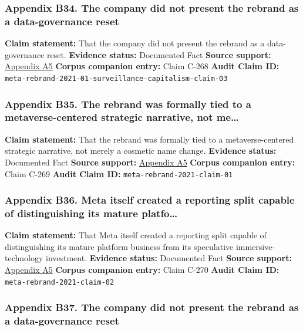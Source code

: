 \documentclass[
  american,
  11pt,
  letterpaper,
]{article}
\begin{document}
\subsubsection{Appendix B34. The company did not present the rebrand as
a data-governance
reset}\label{ch-01-appendix-b34-the-company-did-not-present-the-rebrand-as-a-data-governance-reset}

\textbf{Claim statement:} That the company did not present the rebrand
as a data-governance reset. \textbf{Evidence status:} Documented Fact
\textbf{Source support:}
\hyperref[ch-01-appendix-a5-the-facebook-company-is-now-meta]{Appendix
A5} \textbf{Corpus companion entry:} Claim C-268 \textbf{Audit Claim
ID:} \texttt{meta-rebrand-2021-01-surveillance-capitalism-claim-03}

\subsubsection{Appendix B35. The rebrand was formally tied to a
metaverse-centered strategic narrative, not
me\ldots{}}\label{ch-01-appendix-b35-the-rebrand-was-formally-tied-to-a-metaverse-centered-strategic-narrative-not-me}

\textbf{Claim statement:} That the rebrand was formally tied to a
metaverse-centered strategic narrative, not merely a cosmetic name
change. \textbf{Evidence status:} Documented Fact \textbf{Source
support:}
\hyperref[ch-01-appendix-a5-the-facebook-company-is-now-meta]{Appendix
A5} \textbf{Corpus companion entry:} Claim C-269 \textbf{Audit Claim
ID:} \texttt{meta-rebrand-2021-claim-01}

\subsubsection{Appendix B36. Meta itself created a reporting split
capable of distinguishing its mature
platfo\ldots{}}\label{ch-01-appendix-b36-meta-itself-created-a-reporting-split-capable-of-distinguishing-its-mature-platfo}

\textbf{Claim statement:} That Meta itself created a reporting split
capable of distinguishing its mature platform business from its
speculative immersive-technology investment. \textbf{Evidence status:}
Documented Fact \textbf{Source support:}
\hyperref[ch-01-appendix-a5-the-facebook-company-is-now-meta]{Appendix
A5} \textbf{Corpus companion entry:} Claim C-270 \textbf{Audit Claim
ID:} \texttt{meta-rebrand-2021-claim-02}

\subsubsection{Appendix B37. The company did not present the rebrand as
a data-governance
reset}\label{ch-01-appendix-b37-the-company-did-not-present-the-rebrand-as-a-data-governance-reset}
\end{document}
